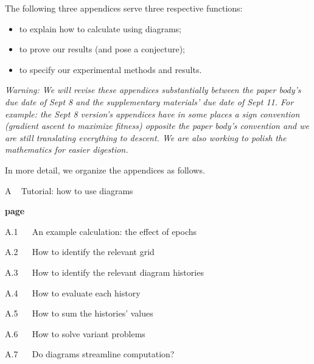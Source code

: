         The following three appendices serve three respective functions:
        \begin{itemize}[noitemsep]
            \item to explain how to calculate using diagrams;
            \item to prove our results (and pose a conjecture);
            \item to specify our experimental methods and results.
        \end{itemize}

        \emph{{\color{moor!90}Warning}:
        We will revise these appendices substantially between the paper body's
        due date of Sept 8 and the supplementary materials' due date of Sept
        11.  For example: the Sept 8 version's appendices have in some places
        a sign convention (gradient \emph{ascent} to maximize fitness) opposite
        the paper body's convention and we are still translating everything to
        \emph{descent}.  We are also working to polish the mathematics
        for easier digestion.
        }

        In more detail, we organize the appendices as follows.\\
    
        {\bf
        \par\noindent A ~ Tutorial: how to use diagrams}                        \hfill {\bf page \pageref{appendix:tutorial}}
        \par\indent     A.1 ~~ An example calculation: the effect of epochs     \hfill \pageref{appendix:example}
        \par\indent     A.2 ~~ How to identify the relevant grid                \hfill \pageref{appendix:draw-spacetime} 
        \par\indent     A.3 ~~ How to identify the relevant diagram histories  \hfill \pageref{appendix:draw-histories}
        \par\indent     A.4 ~~ How to evaluate each history                   \hfill \pageref{appendix:evaluate-histories}
        \par\indent     A.5 ~~ How to sum the histories' values                \hfill \pageref{appendix:sum-histories}
        \par\indent     A.6 ~~ How to solve variant problems                    \hfill \pageref{appendix:solve-variants}
        \par\indent     A.7 ~~ Do diagrams streamline computation?              \hfill \pageref{appendix:diagrams-streamline}
    
